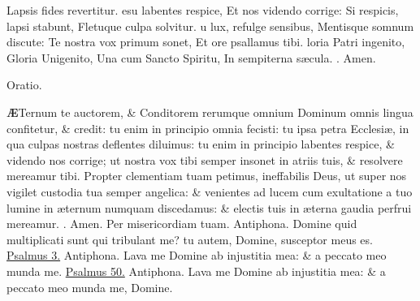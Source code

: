 \documentclass[letter,11pt]{book}
\makeatletter
\DeclareRobustCommand{\Rbar}{\vers@resp{0pt}{R}}
\newcommand{\vers@resp@sym}{\raisebox{0.2ex}{\rotatebox[origin=c]{-20}{$\m@th\rceil$}}}
\newcommand{\vers@resp}[2]{%
  {\ooalign{\hidewidth\kern#1\vers@resp@sym\hidewidth\cr#2\cr}}%
}%
\def\R{\color{Red} \Rbar . \color{black}}
\makeatother
\begin{document}
\begin{multicols}{2}
\newline \indent Lapsis fides revertitur.
esu labentes respice,
\newline \indent Et nos videndo corrige:
\newline \indent Si respicis, lapsi stabunt,
\newline \indent Fletuque culpa solvitur.
u lux, refulge sensibus,
\newline \indent Mentisque somnum discute:
\newline \indent Te nostra vox primum sonet,
\newline \indent Et ore psallamus tibi.
loria Patri ingenito,
\newline \indent Gloria Unigenito,
\newline \indent Una cum Sancto Spiritu,
\newline \indent In sempiterna s\ae cula.
\newline \R Amen.
\vspace{-.5em} \begin{center} \color{Red} Oratio. \end{center} \vspace{-.5em}
\lettrine[lines=2]{\bfseries \color{Red} \AE}{}Ternum te auctorem, \& Conditorem rerumque omnium Dominum omnis lingua confitetur, \& credit: tu enim in principio omnia fecisti: tu ipsa petra Ecclesi\ae , in qua culpas nostras deflentes diluimus: tu enim in principio labentes respice, \& videndo nos corrige; ut nostra vox tibi semper insonet in atriis tuis, \& resolvere mereamur tibi.
Propter clementiam tuam petimus, ineffabilis Deus, ut super nos vigilet custodia tua semper angelica: \& venientes ad lucem cum exultatione a tuo lumine in \ae ternum numquam discedamus: \& electis tuis in \ae terna gaudia perfrui mereamur. \R Amen. Per misericordiam tuam.
\newline \color{Red} Antiphona. \color{black} Domine quid multiplicati sunt qui tribulant me? tu autem, Domine, susceptor meus es. \color{Red} \hyperlink{ps3}{Psalmus 3.} \color{black}%
\newline \color{Red} Antiphona. \color{black} Lava me Domine ab injustitia mea: \& a peccato meo munda me. \color{Red} \hyperlink{ps50}{Psalmus 50.} \color{black}
\newline \color{Red} Antiphona. \color{black} Lava me Domine ab injustitia mea: \& a peccato meo munda me, Domine.

\end{multicols}
\end{document}
